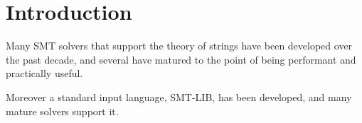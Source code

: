 \section{Introduction}

    Many SMT solvers that support the theory of strings have been developed over the past decade, and several have matured to the point of being performant and practically useful.

    Moreover a standard input language, SMT-LIB, has been developed, and many mature solvers support it.
